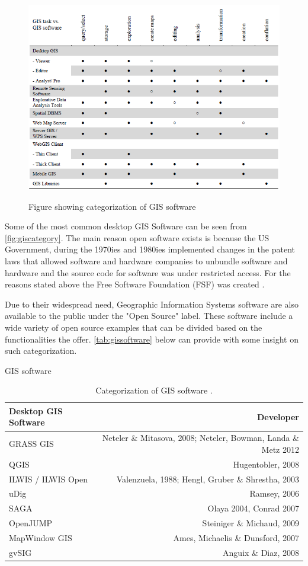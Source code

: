 \begin{figure}[h]
\centering
	{\includegraphics[width=\linewidth]{gfx/OS.png}}
\caption{Figure showing categorization of GIS software \citep{osarticle}}
\label{fig:giscategory}
\end{figure}

Some of the most common desktop GIS Software can be seen from \autoref{fig:giscategory}.
The main reason open software exists is because the US Government, during the 1970ies and 1980ies implemented changes in the patent laws that allowed software and hardware companies to unbundle software and hardware and the source code for software was under restricted access. For the reasons stated above the Free Software Foundation (FSF) was created \citep{osbookde}.


Due to their widespread need, Geographic Information Systems software are also available to the public under the "Open Source" label. These software include a wide variety of open source examples that can be divided based on the functionalities the offer. \autoref{tab:gissoftware} below can provide with some insight on such categorization.  


\begin{table}[h]
\caption{GIS software}
\begin{tabular}{l | r}
Desktop GIS Software & Developer \\ 
\hline
GRASS GIS & Neteler \& Mitasova, 2008; Neteler, Bowman, Landa \& Metz 2012 \\ 
\hline
QGIS & Hugentobler, 2008 \\ 
\hline
ILWIS / ILWIS Open & Valenzuela, 1988; Hengl, Gruber \& Shrestha, 2003 \\ 
\hline
uDig & Ramsey, 2006 \\ 
\hline
SAGA & Olaya 2004, Conrad 2007  \\ 
\hline
OpenJUMP & Steiniger \& Michaud, 2009 \\ 
\hline
MapWindow GIS & Ames, Michaelis \& Dunsford, 2007 \\ 
\hline
gvSIG & Anguix \& Diaz, 2008 \\ 
\hline
\end{tabular}
\caption*{Categorization of GIS software \citep{osarticle}.}
\label{tab:gissoftware}
\end{table}